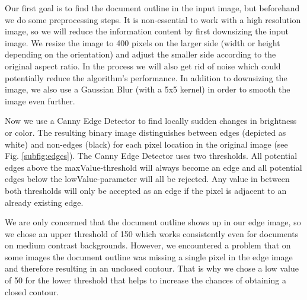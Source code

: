 \documentclass[bibliography=totoc]{scrartcl}
\begin{document}
Our first goal is to find the document outline in the input image, but beforehand we do some preprocessing steps.
It is non-essential to work with a high resolution image, so we will reduce the information content by first downsizing the input image.
We resize the image to 400 pixels on the larger side (width or height depending on the orientation) and adjust the smaller side according to the original aspect ratio.
In the process we will also get rid of noise which could potentially reduce the algorithm's performance.
In addition to downsizing the image, we also use a Gaussian Blur (with a 5x5 kernel) in order to smooth the image even further.

Now we use a Canny Edge Detector to find locally sudden changes in brightness or color.
The resulting binary image distinguishes between edges (depicted as white) and non-edges (black) for each pixel location in the original image (see Fig. \ref{subfig:edges}).
The Canny Edge Detector uses two thresholds.
All potential edges above the maxValue-threshold will always become an edge and all potential edges below the lowValue-parameter will all be rejected.
Any value in between both thresholds will only be accepted as an edge if the pixel is adjacent to an already existing edge. \cite{Canny}

We are only concerned that the document outline shows up in our edge image, so we chose an upper threshold of 150 which works consistently even for documents on medium contrast backgrounds.
However, we encountered a problem that on some images the document outline was missing a single pixel in the edge image and therefore resulting in an unclosed contour.
That is why we chose a low value of 50 for the lower threshold that helps to increase the chances of obtaining a closed contour.\\
\end{document}
